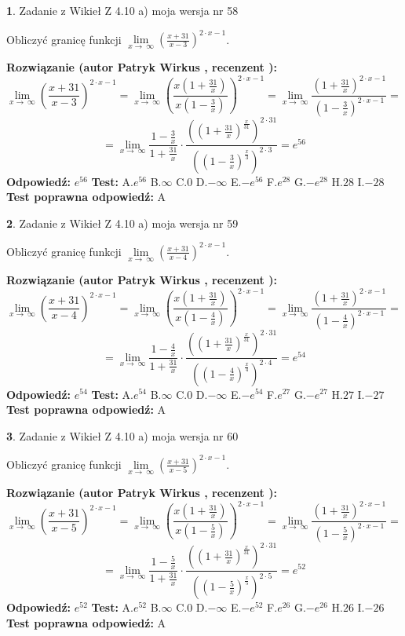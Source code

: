 \documentclass[12pt, a4paper]{article}
\theoremstyle{definition} %
\newtheorem{zad}{}
\newcommand{\zadStart}[1]{\begin{zad}#1\newline}
\newcommand{\zadStop}{\end{zad}}
\newcommand{\rozwStart}[2]{\noindent \textbf{Rozwiązanie (autor #1 , recenzent #2): }\newline}
\newcommand{\rozwStop}{\newline}
\newcommand{\odpStart}{\noindent \textbf{Odpowiedź:}\newline}
\newcommand{\odpStop}{\newline}
\newcommand{\testStart}{\noindent \textbf{Test:}\newline}
\newcommand{\testStop}{\newline}
\newcommand{\kluczStart}{\noindent \textbf{Test poprawna odpowiedź:}\newline}
\newcommand{\kluczStop}{\newline}
\begin{document}
\zadStart{Zadanie z Wikieł Z 4.10 a) moja wersja nr 58}

Obliczyć granicę funkcji  $\lim\limits_{x\to\ \infty}(\frac{x+31}{x-3})^{2\cdot x-1}$.
\zadStop
\rozwStart{Patryk Wirkus}{}
$$\lim\limits_{x\to\ \infty}(\frac{x+31}{x-3})^{2\cdot x-1} = \lim\limits_{x\to\ \infty}(\frac{x(1+\frac{31}{x})}{x(1-\frac{3}{x})})^{2\cdot x-1}=\lim\limits_{x\to\ \infty}\frac{(1+\frac{31}{x})^{2\cdot x-1}}{(1-\frac{3}{x})^{2\cdot x-1}}=$$
$$=\lim\limits_{x\to\ \infty}\frac{1-\frac{3}{x}}{1+\frac{31}{x}}\cdot\frac{((1+\frac{31}{x})^{\frac{x}{31}})^{2\cdot31}}{((1-\frac{3}{x})^{\frac{x}{3}})^{2\cdot3}}=e^{56}$$
\rozwStop
\odpStart
$e^{56}$
\odpStop
\testStart
A.$e^{56}$ B.$\infty$ C.$0$ D.$-\infty$ E.$-e^{56}$
F.$e^{28}$ G.$-e^{28}$
H.$28$
I.$-28$
\testStop
\kluczStart
A
\kluczStop



\zadStart{Zadanie z Wikieł Z 4.10 a) moja wersja nr 59}

Obliczyć granicę funkcji  $\lim\limits_{x\to\ \infty}(\frac{x+31}{x-4})^{2\cdot x-1}$.
\zadStop
\rozwStart{Patryk Wirkus}{}
$$\lim\limits_{x\to\ \infty}(\frac{x+31}{x-4})^{2\cdot x-1} = \lim\limits_{x\to\ \infty}(\frac{x(1+\frac{31}{x})}{x(1-\frac{4}{x})})^{2\cdot x-1}=\lim\limits_{x\to\ \infty}\frac{(1+\frac{31}{x})^{2\cdot x-1}}{(1-\frac{4}{x})^{2\cdot x-1}}=$$
$$=\lim\limits_{x\to\ \infty}\frac{1-\frac{4}{x}}{1+\frac{31}{x}}\cdot\frac{((1+\frac{31}{x})^{\frac{x}{31}})^{2\cdot31}}{((1-\frac{4}{x})^{\frac{x}{4}})^{2\cdot4}}=e^{54}$$
\rozwStop
\odpStart
$e^{54}$
\odpStop
\testStart
A.$e^{54}$ B.$\infty$ C.$0$ D.$-\infty$ E.$-e^{54}$
F.$e^{27}$ G.$-e^{27}$
H.$27$
I.$-27$
\testStop
\kluczStart
A
\kluczStop



\zadStart{Zadanie z Wikieł Z 4.10 a) moja wersja nr 60}

Obliczyć granicę funkcji  $\lim\limits_{x\to\ \infty}(\frac{x+31}{x-5})^{2\cdot x-1}$.
\zadStop
\rozwStart{Patryk Wirkus}{}
$$\lim\limits_{x\to\ \infty}(\frac{x+31}{x-5})^{2\cdot x-1} = \lim\limits_{x\to\ \infty}(\frac{x(1+\frac{31}{x})}{x(1-\frac{5}{x})})^{2\cdot x-1}=\lim\limits_{x\to\ \infty}\frac{(1+\frac{31}{x})^{2\cdot x-1}}{(1-\frac{5}{x})^{2\cdot x-1}}=$$
$$=\lim\limits_{x\to\ \infty}\frac{1-\frac{5}{x}}{1+\frac{31}{x}}\cdot\frac{((1+\frac{31}{x})^{\frac{x}{31}})^{2\cdot31}}{((1-\frac{5}{x})^{\frac{x}{5}})^{2\cdot5}}=e^{52}$$
\rozwStop
\odpStart
$e^{52}$
\odpStop
\testStart
A.$e^{52}$ B.$\infty$ C.$0$ D.$-\infty$ E.$-e^{52}$
F.$e^{26}$ G.$-e^{26}$
H.$26$
I.$-26$
\testStop
\kluczStart
A
\kluczStop
\end{document}
